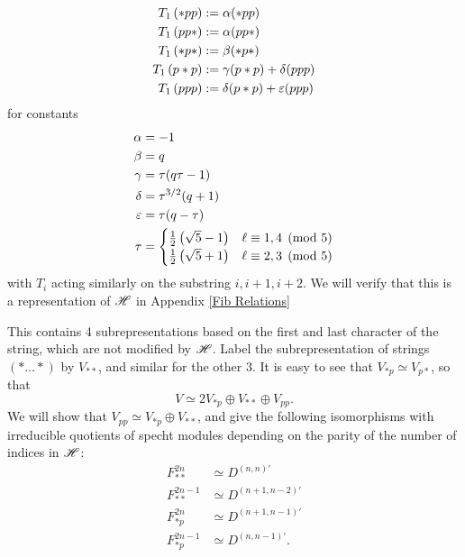 \documentclass{amsart}
\begin{document}
\begin{equation}
  \begin{split}
  T_1 \, (*pp) &:= \alpha(*pp)\\
  T_1 \, (pp*) &:= \alpha(pp*)\\
  T_1 \, (*p*) &:= \beta(*p*)\\
  T_1 \, (p*p) &:= \gamma(p*p) + \delta(ppp)\\
  T_1 \, (ppp) &:= \delta(p*p) + \varepsilon(ppp)
\end{split} \label{Fib Action} 
\end{equation}
for constants
\begin{equation}
  \begin{split}
  \alpha &= -1\\
  \beta &= q\\
  \gamma &= \tau(q\tau - 1)\\
  \delta &= \tau^{3/2}(q + 1)\\
  \varepsilon &= \tau(q-\tau)\\
  \tau &= \begin{cases}
    \frac{1}{2}\left( \sqrt 5 - 1 \right) & \ell \equiv 1,4 \pmod 5\\
    \frac{1}{2}\left( \sqrt 5 + 1 \right) & \ell \equiv 2,3 \pmod 5
  \end{cases}
\end{split} \label{Fib Constants} 
\end{equation}
with $T_i$ acting similarly on the substring $i,i+1,i+2$.
We will verify that this is a representation of $\mathscr{H}$ in Appendix \ref{Fib Relations}

This contains 4 subrepresentations based on the first and last character of the string, which are not modified by $\mathscr{H}$.
Label the subrepresentation of strings $(*\dots*)$ by $V_{**}$, and similar for the other 3.
It is easy to see that $V_{*p} \simeq V_{p*}$, so that
\[
  V \simeq 2V_{*p} \oplus V_{**} \oplus V_{pp}.
\]
We will show that $V_{pp} \simeq V_{*p} \oplus V_{**}$, and give the following isomorphisms with irreducible quotients of specht modules depending on the parity of the number of indices in $\mathscr{H}$:
\begin{equation}
  \begin{split}    
    F^{2n}_{**} &\simeq D^{(n,n)'}\\ 
    F^{2n-1}_{**} &\simeq D^{(n+1,n-2)'}\\
    F^{2n}_{*p} &\simeq D^{(n+1,n-1)'}\\
    F^{2n-1}_{*p} &\simeq D^{(n,n-1)'}.
  \end{split} \label{Fib Isos}
\end{equation}
 
\end{document}
